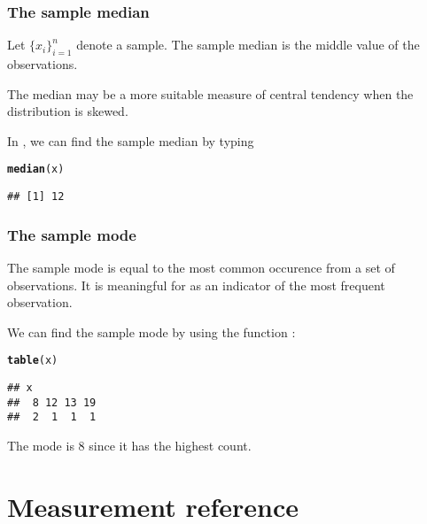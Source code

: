\documentclass[compress]{beamer}\usepackage[]{graphicx}\usepackage[]{xcolor}
\makeatletter
\newcommand{\hlstd}[1]{\textcolor[rgb]{0.345,0.345,0.345}{#1}}%
\newcommand{\hlkwd}[1]{\textcolor[rgb]{0.737,0.353,0.396}{\textbf{#1}}}%
\newenvironment{kframe}{%
 \def\at@end@of@kframe{}%
 \ifinner\ifhmode%
  \def\at@end@of@kframe{\end{minipage}}%
  \begin{minipage}{\columnwidth}%
 \fi\fi%
 \def\FrameCommand##1{\hskip\@totalleftmargin \hskip-\fboxsep
 \colorbox{shadecolor}{##1}\hskip-\fboxsep
     \hskip-\linewidth \hskip-\@totalleftmargin \hskip\columnwidth}%
 \MakeFramed {\advance\hsize-\width
   \@totalleftmargin\z@ \linewidth\hsize
   \@setminipage}}%
 {\par\unskip\endMakeFramed%
 \at@end@of@kframe}
\newenvironment{knitrout}{}{} %
\makeatother
\begin{document}
\begin{frame}[fragile]
  \frametitle{The sample median}
    Let $\{x_i\}_{i=1}^n$ denote a sample. The sample median is the middle value of the observations.

    The median may be a more suitable measure of central tendency when the distribution is skewed.

    In \CR, we can find the sample median by typing
\begin{knitrout}
\color{fgcolor}\begin{kframe}
\begin{alltt}
  \hlkwd{median}\hlstd{(x)}
\end{alltt}
\begin{verbatim}
## [1] 12
\end{verbatim}
\end{kframe}
\end{knitrout}
\end{frame}

\begin{frame}[fragile]
  \frametitle{The sample mode}
    The sample mode is equal to the most common occurence from a set of observations. It is meaningful for  as an indicator of the most frequent observation.

    We can find the sample mode by using the \cR function :
\begin{knitrout}
\color{fgcolor}\begin{kframe}
\begin{alltt}
  \hlkwd{table}\hlstd{(x)}
\end{alltt}
\begin{verbatim}
## x
##  8 12 13 19 
##  2  1  1  1
\end{verbatim}
\end{kframe}
\end{knitrout}

    The mode is $8$ since it has the highest count.
\end{frame}


\section{Measurement reference}
\end{document}
